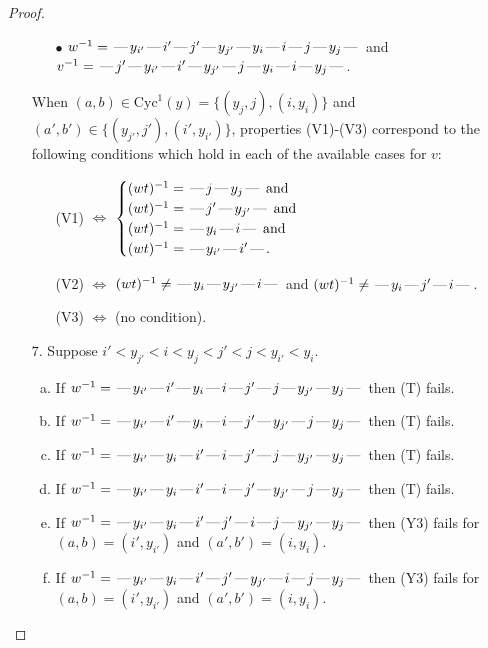\documentclass[10pt]{article}
\theoremstyle{definition}
\theoremstyle{definition}
\def\dash{\text{\hspace{0.5mm}---\hspace{0.5mm}}}
\def\Cyc{\mathrm{Cyc}}
\begin{document}
\begin{proof}
\begin{enumerate}
\begin{enumerate}
\item[$\bullet$] $w^{-1} = \dash y_{i'}\dash i'\dash j'\dash y_{j'}\dash y_i\dash i\dash j\dash y_j\dash $ and $v^{-1} = \dash j'\dash y_{i'}\dash i'\dash y_{j'}\dash j\dash y_i\dash i\dash y_j\dash $.
\end{enumerate}
When $(a,b)\in\Cyc^1(y)=\{(y_j,j),(i,y_i)\}$ and $(a',b')\in\{(y_{j'},j'),(i',y_{i'})\}$,
properties (V1)-(V3) correspond to the following conditions which hold in
each of the available cases for $v$:
\begin{enumerate}
\item[](V1) $\Leftrightarrow$ $\begin{cases}\text{$(wt)^{-1} = \dash j \dash y_j \dash$}\text{ and }\\
\text{$(wt)^{-1} = \dash j' \dash y_{j'} \dash$}\text{ and }\\
\text{$(wt)^{-1} = \dash y_i \dash i \dash$}\text{ and }\\
\text{$(wt)^{-1} = \dash y_{i'} \dash i' \dash$}.\end{cases}$
\item[](V2) $\Leftrightarrow$ $(wt)^{-1} \neq \dash y_i \dash y_{j'} \dash i \dash$ and $(wt)^{-1}\neq \dash y_i \dash j' \dash i \dash$.
\item[](V3) $\Leftrightarrow$ (no condition).
\end{enumerate}
\item[$7$.] Suppose $i' < y_{j'} < i < y_j < j' < j < y_{i'} < y_i$.
\begin{enumerate}[(a)]
\item If $w^{-1} = \dash y_{i'}\dash i'\dash y_i\dash i\dash j'\dash j\dash y_{j'}\dash y_j\dash $ then (T) fails.
\item If $w^{-1} = \dash y_{i'}\dash i'\dash y_i\dash i\dash j'\dash y_{j'}\dash j\dash y_j\dash $ then (T) fails.
\item If $w^{-1} = \dash y_{i'}\dash y_i\dash i'\dash i\dash j'\dash j\dash y_{j'}\dash y_j\dash $ then (T) fails.
\item If $w^{-1} = \dash y_{i'}\dash y_i\dash i'\dash i\dash j'\dash y_{j'}\dash j\dash y_j\dash $ then (T) fails.
\item If $w^{-1} = \dash y_{i'}\dash y_i\dash i'\dash j'\dash i\dash j\dash y_{j'}\dash y_j\dash $ then (Y3) fails for $(a,b)=(i',y_{i'})$ and $(a',b')=(i,y_i)$.
\item If $w^{-1} = \dash y_{i'}\dash y_i\dash i'\dash j'\dash y_{j'}\dash i\dash j\dash y_j\dash $ then (Y3) fails for $(a,b)=(i',y_{i'})$ and $(a',b')=(i,y_i)$.

\end{enumerate}
\end{enumerate}
\end{proof}
\end{document}
